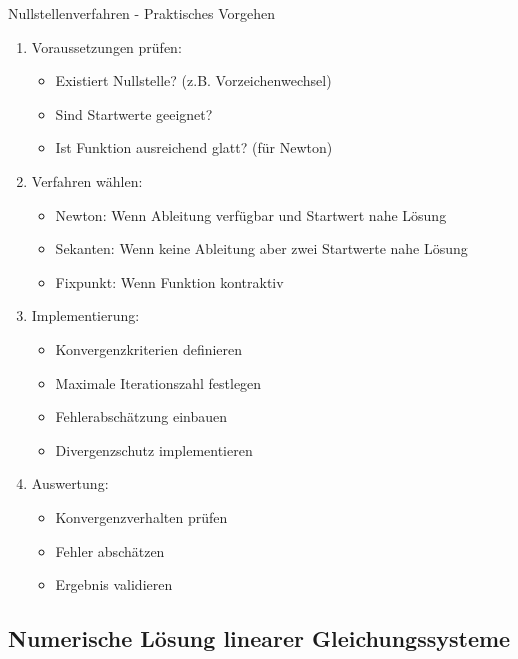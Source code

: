 \begin{KR}{Nullstellenverfahren - Praktisches Vorgehen}
\begin{enumerate}
    \item Voraussetzungen prüfen:
    \begin{itemize}
        \item Existiert Nullstelle? (z.B. Vorzeichenwechsel)
        \item Sind Startwerte geeignet?
        \item Ist Funktion ausreichend glatt? (für Newton)
    \end{itemize}
    
    \item Verfahren wählen:
    \begin{itemize}
        \item Newton: Wenn Ableitung verfügbar und Startwert nahe Lösung
        \item Sekanten: Wenn keine Ableitung aber zwei Startwerte nahe Lösung
        \item Fixpunkt: Wenn Funktion kontraktiv
    \end{itemize}
    
    \item Implementierung:
    \begin{itemize}
        \item Konvergenzkriterien definieren
        \item Maximale Iterationszahl festlegen
        \item Fehlerabschätzung einbauen
        \item Divergenzschutz implementieren
    \end{itemize}
    
    \item Auswertung:
    \begin{itemize}
        \item Konvergenzverhalten prüfen
        \item Fehler abschätzen
        \item Ergebnis validieren
    \end{itemize}
\end{enumerate}
\end{KR}

\subsection{Numerische Lösung linearer Gleichungssysteme}

